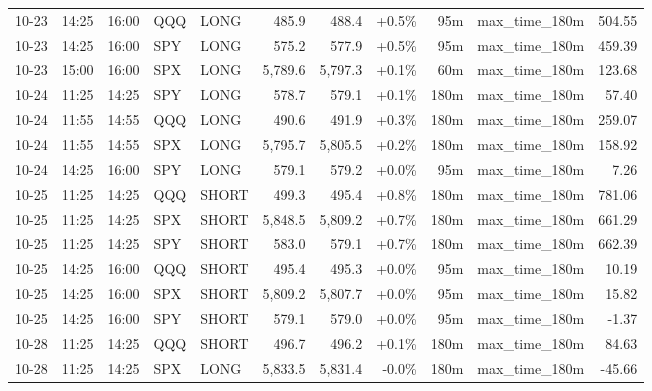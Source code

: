 \documentclass[11pt,a4paper,twoside]{article}
\begin{document}
\begin{center}
\begin{longtable}{>{\color{txtmain}}l l l l l r r r r >{\color{txtmain}}l r}
10-23 & 14:25 & 16:00 & QQQ & LONG & 485.9 & 488.4 & \textcolor{wingreen}{+0.5\%} & 95m & max\_time\_180m & \textcolor{wingreen}{504.55} \\
10-23 & 14:25 & 16:00 & SPY & LONG & 575.2 & 577.9 & \textcolor{wingreen}{+0.5\%} & 95m & max\_time\_180m & \textcolor{wingreen}{459.39} \\
10-23 & 15:00 & 16:00 & SPX & LONG & 5,789.6 & 5,797.3 & \textcolor{wingreen}{+0.1\%} & 60m & max\_time\_180m & \textcolor{wingreen}{123.68} \\
10-24 & 11:25 & 14:25 & SPY & LONG & 578.7 & 579.1 & \textcolor{wingreen}{+0.1\%} & 180m & max\_time\_180m & \textcolor{wingreen}{57.40} \\
10-24 & 11:55 & 14:55 & QQQ & LONG & 490.6 & 491.9 & \textcolor{wingreen}{+0.3\%} & 180m & max\_time\_180m & \textcolor{wingreen}{259.07} \\
10-24 & 11:55 & 14:55 & SPX & LONG & 5,795.7 & 5,805.5 & \textcolor{wingreen}{+0.2\%} & 180m & max\_time\_180m & \textcolor{wingreen}{158.92} \\
10-24 & 14:25 & 16:00 & SPY & LONG & 579.1 & 579.2 & \textcolor{wingreen}{+0.0\%} & 95m & max\_time\_180m & \textcolor{wingreen}{7.26} \\
10-25 & 11:25 & 14:25 & QQQ & SHORT & 499.3 & 495.4 & \textcolor{wingreen}{+0.8\%} & 180m & max\_time\_180m & \textcolor{wingreen}{781.06} \\
10-25 & 11:25 & 14:25 & SPX & SHORT & 5,848.5 & 5,809.2 & \textcolor{wingreen}{+0.7\%} & 180m & max\_time\_180m & \textcolor{wingreen}{661.29} \\
10-25 & 11:25 & 14:25 & SPY & SHORT & 583.0 & 579.1 & \textcolor{wingreen}{+0.7\%} & 180m & max\_time\_180m & \textcolor{wingreen}{662.39} \\
10-25 & 14:25 & 16:00 & QQQ & SHORT & 495.4 & 495.3 & \textcolor{wingreen}{+0.0\%} & 95m & max\_time\_180m & \textcolor{wingreen}{10.19} \\
10-25 & 14:25 & 16:00 & SPX & SHORT & 5,809.2 & 5,807.7 & \textcolor{wingreen}{+0.0\%} & 95m & max\_time\_180m & \textcolor{wingreen}{15.82} \\
10-25 & 14:25 & 16:00 & SPY & SHORT & 579.1 & 579.0 & \textcolor{wingreen}{+0.0\%} & 95m & max\_time\_180m & \textcolor{lossred}{-1.37} \\
10-28 & 11:25 & 14:25 & QQQ & SHORT & 496.7 & 496.2 & \textcolor{wingreen}{+0.1\%} & 180m & max\_time\_180m & \textcolor{wingreen}{84.63} \\
10-28 & 11:25 & 14:25 & SPX & LONG & 5,833.5 & 5,831.4 & \textcolor{lossred}{-0.0\%} & 180m & max\_time\_180m & \textcolor{lossred}{-45.66} \\

\end{longtable}
\end{center}
\end{document}
